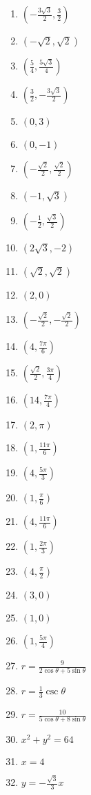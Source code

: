 \begin{multicols}{3}
\begin{enumerate}
	\item $\left(-\frac{3\sqrt{3}}{2}, \frac{3}{2}\right)$
    \item $(-\sqrt{2}, \sqrt{2})$
    \item $\left(\frac{5}{4}, \frac{5\sqrt{3}}{4}\right)$
    \item $\left(\frac{3}{2}, -\frac{3\sqrt{3}}{2}\right)$
    \item $(0, 3)$
    \item $(0, -1)$
    \item $\left(-\frac{\sqrt{2}}{2}, \frac{\sqrt{2}}{2}\right)$
    \item $\left(-1, \sqrt{3}\right)$
    \item $\left(-\frac{1}{2}, \frac{\sqrt{3}}{2}\right)$
    \item $\left(2\sqrt{3}, -2\right)$
    \item $\left(\sqrt{2}, \sqrt{2}\right)$
    \item $(2,0)$
    \item $\left(-\frac{\sqrt{2}}{2}, -\frac{\sqrt{2}}{2}\right)$
    
    \item $\left(4, \frac{7\pi}{6}\right)$
    \item $\left(\frac{\sqrt{2}}{2}, \frac{3\pi}{4}\right)$
    \item $\left(14, \frac{7\pi}{4}\right)$
    \item $(2, \pi)$
    \item $\left(1, \frac{11\pi}{6}\right)$
    \item $\left(4, \frac{5\pi}{3}\right)$
    \item $\left(1, \frac{\pi}{6}\right)$
    \item $\left(4, \frac{11\pi}{6}\right)$
    \item $\left(1, \frac{2\pi}{3}\right)$
    \item $\left(4, \frac{\pi}{2}\right)$
    \item $(3,0)$
    \item $(1,0)$
  	\item $\left(1, \frac{5\pi}{4}\right)$
    
    \item $r = \frac{9}{2\cos\theta+5\sin\theta}$
    \item $r = \frac{1}{3}\csc\theta$
    \item $r = \frac{10}{5\cos\theta+8\sin\theta}$
    \item $x^2+y^2=64$
    \item $x = 4$
    \item $y = -\frac{\sqrt{3}}{3}x$
\end{enumerate}
\end{multicols}